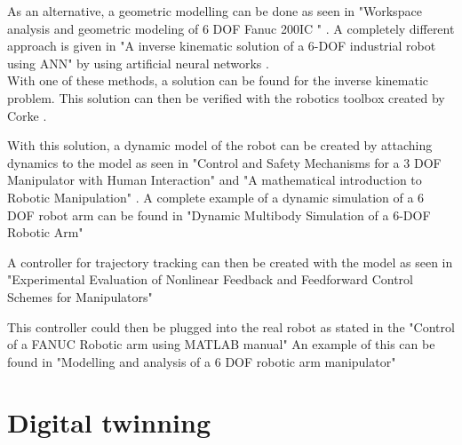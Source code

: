 As an alternative, a geometric modelling can be done as seen in "Workspace analysis and geometric modeling of 6 DOF Fanuc 200IC " \cite{geomModelingKamel}. 
A completely different approach is given in "A inverse kinematic solution of  a 6-DOF industrial robot using ANN" by using artificial neural networks \cite{invKinANNKSHITISH}.\\
%
%
With one of these methods, a solution can be found for the inverse kinematic problem.
This solution can then be verified with the robotics toolbox created by Corke \cite{CorkeRoboticsToolbox}.

With this solution, a dynamic model of the robot can be created by attaching dynamics to the model as seen in "Control and Safety Mechanisms for a 3 DOF Manipulator with Human Interaction" \cite{KongWei} and "A mathematical introduction to Robotic Manipulation" \cite{MathIntroRobManip}. A complete example of a dynamic simulation of a 6 \ac{DOF} robot arm can be found in "Dynamic Multibody Simulation of a 6-DOF Robotic Arm" \cite{Dyn6DOFBinLi}

A controller for trajectory tracking can then be created with the model as seen in "Experimental Evaluation of Nonlinear Feedback and Feedforward Control Schemes for Manipulators" \cite{evalNonlinFeedForBackControl}

This controller could then be plugged into the real robot as stated in the "Control of a FANUC Robotic arm using MATLAB manual"  \cite{FANUCcontrolMatlab} An example of this can be found in "Modelling and analysis of a 6 DOF robotic arm manipulator" \cite{RobotModelAnalContrexampleJamshed}



\section{Digital twinning}


